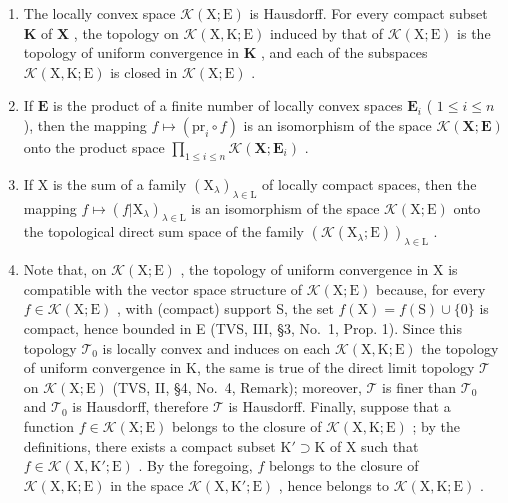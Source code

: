 \begin{enumerate}
\def\labelenumi{(\roman{enumi})}
\item
  The locally convex space \(\mathcal{K}(\mathrm{X};\mathrm{E})\) is Hausdorff. For every compact subset \(\mathbf{K}\) of \(\mathbf{X}\) , the topology on \(\mathcal{K}(\mathrm{X},\mathrm{K};\mathrm{E})\) induced by that of \(\mathcal{K}(\mathrm{X};\mathrm{E})\) is the topology of uniform convergence in \(\mathbf{K}\) , and each of the subspaces \(\mathcal{K}(\mathrm{X},\mathrm{K};\mathrm{E})\) is closed in \(\mathcal{K}(\mathrm{X};\mathrm{E})\) .
\item
  If \(\mathbf{E}\) is the product of a finite number of locally convex spaces \(\mathbf{E}_i\) ( \(1 \leqslant i \leqslant n\) ), then the mapping \(f \mapsto (\mathrm{pr}_i \circ f)\) is an isomorphism of the space \(\mathcal{K}(\mathbf{X};\mathbf{E})\) onto the product space \(\prod_{1 \leqslant i \leqslant n} \mathcal{K}(\mathbf{X};\mathbf{E}_i)\) .
\item
  If \(\mathrm{X}\) is the sum of a family \((\mathrm{X}_{\lambda})_{\lambda \in \mathrm{L}}\) of locally compact spaces, then the mapping \(f \mapsto (f|\mathrm{X}_{\lambda})_{\lambda \in \mathrm{L}}\) is an isomorphism of the space \(\mathcal{K}(\mathrm{X};\mathrm{E})\) onto the topological direct sum space of the family \((\mathcal{K}(\mathrm{X}_{\lambda};\mathrm{E}))_{\lambda \in \mathrm{L}}\) .
\item
  Note that, on \(\mathcal{K}(\mathrm{X};\mathrm{E})\) , the topology of uniform convergence in X is compatible with the vector space structure of \(\mathcal{K}(\mathrm{X};\mathrm{E})\) because, for every \(f\in \mathcal{K}(\mathrm{X};\mathrm{E})\) , with (compact) support S, the set \(f(\mathrm{X}) = f(\mathrm{S})\cup \{0\}\) is compact, hence bounded in E (TVS, III, §3, No.~1, Prop. 1). Since this topology \(\mathcal{T}_0\) is locally convex and induces on each \(\mathcal{K}(\mathrm{X},\mathrm{K};\mathrm{E})\) the topology of uniform convergence in K, the same is true of the direct limit topology \(\mathcal{T}\) on \(\mathcal{K}(\mathrm{X};\mathrm{E})\) (TVS, II, §4, No.~4, Remark); moreover, \(\mathcal{T}\) is finer than \(\mathcal{T}_0\) and \(\mathcal{T}_0\) is Hausdorff, therefore \(\mathcal{T}\) is Hausdorff. Finally, suppose that a function \(f\in \mathcal{K}(\mathrm{X};\mathrm{E})\) belongs to the closure of \(\mathcal{K}(\mathrm{X},\mathrm{K};\mathrm{E})\) ; by the definitions, there exists a compact subset \(\mathrm{K}'\supset \mathrm{K}\) of X such that \(f\in \mathcal{K}(\mathrm{X},\mathrm{K}';\mathrm{E})\) . By the foregoing, \(f\) belongs to the closure of \(\mathcal{K}(\mathrm{X},\mathrm{K};\mathrm{E})\) in the space \(\mathcal{K}(\mathrm{X},\mathrm{K}';\mathrm{E})\) , hence belongs to \(\mathcal{K}(\mathrm{X},\mathrm{K};\mathrm{E})\) .

\end{enumerate}
